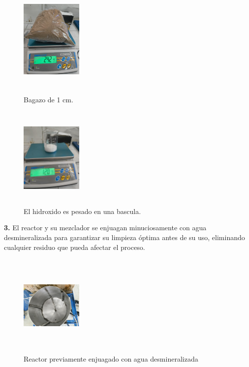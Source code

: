 \documentclass[12pt]{article}
\begin{document}
			
					\begin{figure}[H]
				\centering
				\begin{minipage}{0.46\textwidth}
					\centering
						\includegraphics[width=3cm, height=5cm]{imagenes/pesado4}
					\caption{Bagazo de 1 cm.}
					\label{bagazo1}
				\end{minipage}
				\hfill
				\begin{minipage}{0.48\textwidth}
					\centering
						\includegraphics[width=3cm, height=5cm]{imagenes/hidroxido_pesado}
					\caption{El hidroxido es pesado en una bascula.}
					\label{cernir_bagazo_hidroxidopesado}
				\end{minipage}
			\end{figure}
			
			
			
			\textbf{3.} El reactor y su mezclador se enjuagan minuciosamente con agua desmineralizada para garantizar su limpieza óptima antes de su uso, eliminando cualquier residuo que pueda afectar el proceso.
			\begin{figure} [H]
				\centering
				\includegraphics[width=3cm, height=5cm,angle=90]{imagenes/reactor limpio}
				\caption{Reactor previamente enjuagado con agua desmineralizada}
				\label{reactor limpio}
			\end{figure}
		
\end{document}
